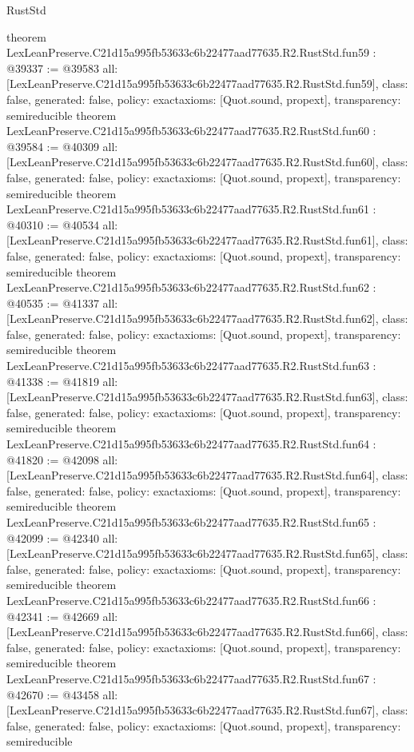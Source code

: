 \begin{lexlean}{RustStd}
\begin{coremodule}
{}
theorem LexLeanPreserve.C21d15a995fb53633c6b22477aad77635.R2.RustStd.fun59 : @39337 := @39583 {
  all: [LexLeanPreserve.C21d15a995fb53633c6b22477aad77635.R2.RustStd.fun59],
  class: false,
  generated: false,
  policy: exact{axioms: [Quot.sound, propext]},
  transparency: semireducible
}
theorem LexLeanPreserve.C21d15a995fb53633c6b22477aad77635.R2.RustStd.fun60 : @39584 := @40309 {
  all: [LexLeanPreserve.C21d15a995fb53633c6b22477aad77635.R2.RustStd.fun60],
  class: false,
  generated: false,
  policy: exact{axioms: [Quot.sound, propext]},
  transparency: semireducible
}
theorem LexLeanPreserve.C21d15a995fb53633c6b22477aad77635.R2.RustStd.fun61 : @40310 := @40534 {
  all: [LexLeanPreserve.C21d15a995fb53633c6b22477aad77635.R2.RustStd.fun61],
  class: false,
  generated: false,
  policy: exact{axioms: [Quot.sound, propext]},
  transparency: semireducible
}
theorem LexLeanPreserve.C21d15a995fb53633c6b22477aad77635.R2.RustStd.fun62 : @40535 := @41337 {
  all: [LexLeanPreserve.C21d15a995fb53633c6b22477aad77635.R2.RustStd.fun62],
  class: false,
  generated: false,
  policy: exact{axioms: [Quot.sound, propext]},
  transparency: semireducible
}
theorem LexLeanPreserve.C21d15a995fb53633c6b22477aad77635.R2.RustStd.fun63 : @41338 := @41819 {
  all: [LexLeanPreserve.C21d15a995fb53633c6b22477aad77635.R2.RustStd.fun63],
  class: false,
  generated: false,
  policy: exact{axioms: [Quot.sound, propext]},
  transparency: semireducible
}
theorem LexLeanPreserve.C21d15a995fb53633c6b22477aad77635.R2.RustStd.fun64 : @41820 := @42098 {
  all: [LexLeanPreserve.C21d15a995fb53633c6b22477aad77635.R2.RustStd.fun64],
  class: false,
  generated: false,
  policy: exact{axioms: [Quot.sound, propext]},
  transparency: semireducible
}
theorem LexLeanPreserve.C21d15a995fb53633c6b22477aad77635.R2.RustStd.fun65 : @42099 := @42340 {
  all: [LexLeanPreserve.C21d15a995fb53633c6b22477aad77635.R2.RustStd.fun65],
  class: false,
  generated: false,
  policy: exact{axioms: [Quot.sound, propext]},
  transparency: semireducible
}
theorem LexLeanPreserve.C21d15a995fb53633c6b22477aad77635.R2.RustStd.fun66 : @42341 := @42669 {
  all: [LexLeanPreserve.C21d15a995fb53633c6b22477aad77635.R2.RustStd.fun66],
  class: false,
  generated: false,
  policy: exact{axioms: [Quot.sound, propext]},
  transparency: semireducible
}
theorem LexLeanPreserve.C21d15a995fb53633c6b22477aad77635.R2.RustStd.fun67 : @42670 := @43458 {
  all: [LexLeanPreserve.C21d15a995fb53633c6b22477aad77635.R2.RustStd.fun67],
  class: false,
  generated: false,
  policy: exact{axioms: [Quot.sound, propext]},
  transparency: semireducible
}
\end{coremodule}
\end{lexlean}
